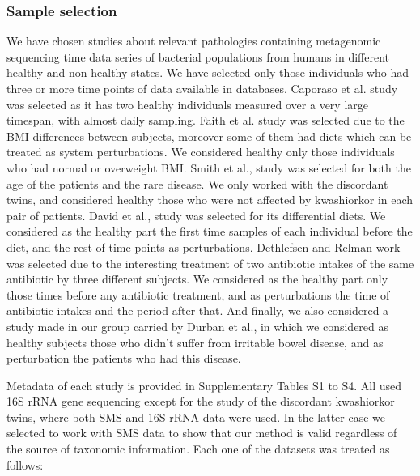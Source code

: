 \subsubsection*{Sample selection}
We have chosen studies about relevant pathologies containing metagenomic sequencing time data series of bacterial populations from humans in different healthy and non-healthy states. We have selected only those individuals who had three or more time points of data available in databases. Caporaso et al. study \cite{moving} was selected as it has two healthy individuals measured over a very large timespan, with almost daily sampling. Faith et al. study \cite{LEA} was selected due to the BMI differences between subjects, moreover some of them had diets which can be treated as system perturbations. We considered healthy only those individuals who had normal or overweight BMI. Smith et al., study \cite{kwashiorkor} was selected for both the age of the patients and the rare disease. We only worked with the discordant twins, and considered healthy those who were not affected by kwashiorkor in each pair of patients. David et al., study \cite{diet} was selected for its differential diets. We considered as the healthy part the first time samples of each individual before the diet, and the rest of time points as perturbations. Dethlefsen and Relman work \cite{antibiotic} was selected due to the interesting treatment of two antibiotic intakes of the same antibiotic by three different subjects. We considered as the healthy part only those times before any antibiotic treatment, and as perturbations the time of antibiotic intakes and the period after that. And finally, we also considered a study made in our group carried by Durban et al., \cite{IBS} in which we considered as healthy subjects those who didn't suffer from irritable bowel disease, and as perturbation the patients who had this disease. 

Metadata of each study is provided in Supplementary Tables S1 to S4. All used 16S rRNA gene sequencing except for the study of the discordant kwashiorkor twins\cite{kwashiorkor}, where both SMS and 16S rRNA data were used. In the latter case we selected to work with SMS data to show that our method is valid regardless of the source of taxonomic information. Each one of the datasets was treated as follows:

